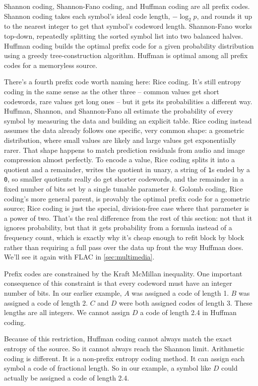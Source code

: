 \documentclass[11pt]{article}
\begin{document}
Shannon coding, Shannon-Fano coding, and Huffman coding are all prefix
codes. Shannon coding takes each symbol's ideal code length, $-\log_2 p$,
and rounds it up to the nearest integer to get that symbol's codeword
length. Shannon-Fano works top-down, repeatedly splitting
the sorted symbol list into two balanced halves. Huffman coding builds the
optimal prefix code for a given probability distribution using a greedy
tree-construction algorithm. Huffman is optimal among all prefix codes for a
memoryless source.

There's a fourth prefix code worth naming here: Rice coding. It's still
entropy coding in the same sense as the other three -- common values get
short codewords, rare values get long ones -- but it gets its probabilities
a different way. Huffman, Shannon, and Shannon-Fano all estimate the
probability of every symbol by measuring the data and building an explicit
table. Rice coding instead assumes the data already follows one specific,
very common shape: a geometric distribution, where small values are likely
and large values get exponentially rarer. That shape happens to match
prediction residuals from audio and image compression almost perfectly. To
encode a value, Rice coding splits it into a quotient and a remainder,
writes the quotient in unary, a string of \texttt{1}s ended by a
\texttt{0}, so smaller quotients really do get shorter codewords, and the
remainder in a fixed number of bits set by a single tunable parameter $k$.
Golomb coding, Rice coding's more general parent, is provably the optimal
prefix code for a geometric source; Rice coding is just the special,
division-free case where that parameter is a power of two. That's the real
difference from the rest of this section: not that it ignores probability,
but that it gets probability from a formula instead of a frequency count,
which is exactly why it's cheap enough to refit block by block rather than
requiring a full pass over the data up front the way Huffman does. We'll
see it again with FLAC in \ref{sec:multimedia}.

Prefix codes are constrained by the Kraft McMillan inequality. One important
consequence of this constraint is that every codeword must have an integer
number of bits. In our earlier example, $A$ was assigned a code of length 1.
$B$ was assigned a code of length 2. $C$ and $D$ were both assigned codes of
length 3. These lengths are all integers. We cannot assign $D$ a code of
length 2.4 in Huffman coding.

Because of this restriction, Huffman coding cannot always match the exact
entropy of the source. So it cannot always reach the Shannon limit.
Arithmetic coding is different. It is a non-prefix entropy coding method. It
can assign each symbol a code of fractional length. So in our example, a
symbol like $D$ could actually be assigned a code of length 2.4.
\end{document}
